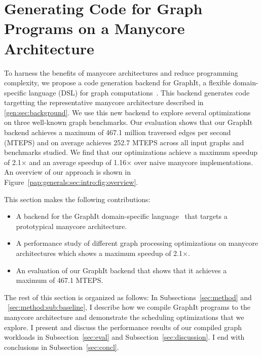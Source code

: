 \chapter{Generating Code for Graph Programs on a Manycore Architecture}\label{gen:sec:graphitbackend}

\introOverviewFigure

To harness the benefits of manycore architectures and reduce programming complexity, we propose a code generation backend for GraphIt, a flexible domain-specific language (DSL) for graph computations~\cite{zhang2018graphit}. 
This backend generates code targetting the representative manycore architecture described in \ref{gen:sec:background}.
We use this new backend to explore several optimizations on three well-known graph benchmarks.
Our evaluation shows that our GraphIt backend achieves a maximum of 467.1 million traversed edges per second (MTEPS) and on average achieves 252.7 MTEPS across all input graphs and benchmarks studied. 
We find that our optimizations achieve a maximum speedup of 2.1$\times$ and an average speedup of 1.16$\times$ over naive manycore implementations.
An overview of our approach is shown in Figure~\ref{pap:generals:sec:intro:fig:overview}.

This section makes the following contributions:
\begin{itemize}
    \item A backend for the GraphIt domain-specific language~\cite{zhang2018graphit} that targets a prototypical manycore architecture.
    \item A performance study of different graph processing optimizations on manycore architectures which shows a maximum speedup of 2.1$\times$.
    \item An evaluation of our GraphIt backend that shows that it achieves a maximum of 467.1 MTEPS.
\end{itemize}

The rest of this section is organized as follows:
In Subsections~\ref{sec:method} and ~\ref{sec:method:sub:baseline}, I describe how we compile GraphIt programs to the manycore architecture and demonstrate the scheduling optimizations that we explore.
I present and discuss the performance results of our compiled graph workloads in Subsection~\ref{sec:eval} and Subsection~\ref{sec:discussion}.
I end with conclusions in Subsection~\ref{sec:concl}.

%
%

%

